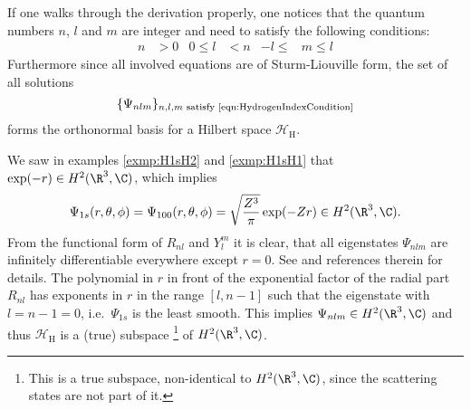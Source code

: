 If one walks through the derivation properly,
one notices that the quantum numbers $n$, $l$ and $m$ are integer and need to satisfy
the following conditions:
\begin{align}
	\label{eqn:HydrogenIndexCondition}
	n &> 0 & 0 \leq l &< n & -l \leq &m \leq l
\end{align}
Furthermore since all involved equations are of Sturm-Liouville form,
the set of all solutions
\[
	\{\Psi_{nlm} \}_{n,l,m \text{ satisfy \eqref{eqn:HydrogenIndexCondition}}}
\]
forms the orthonormal basis for a Hilbert space $\mathcal{H}_\text{H}$.

We saw in examples \vref{exmp:H1sH2} and \vref{exmp:H1sH1}
that $\exp(-r) \in H^2(\R^3, \C)$,
which implies
\[
	\Psi_{1s}(r, \theta, \phi) = \Psi_{100}(r, \theta, \phi)
	= \sqrt{\frac{Z^3}{\pi}} \exp(-Z r) \in H^2(\R^3, \C).
\]
From the functional form of $R_{nl}$ and $Y_l^m$ it is clear,
that all eigenstates $\Psi_{nlm}$ are infinitely differentiable everywhere
except $r = 0$.
See \cite{Kato1957} and references therein for details.
The polynomial in $r$ in front of the exponential factor of the radial part $R_{nl}$
has exponents in $r$ in the range $[l, n-1]$
such that the eigenstate with $l = n-1 = 0$, i.e.~$\Psi_{1s}$ is the least smooth.
This implies $\Psi_{nlm} \in H^2(\R^3, \C)$ and thus
$\mathcal{H}_\text{H}$ is a (true) subspace
\footnote{
	This is a true subspace, \ie non-identical to $H^2(\R^3, \C)$,
	since the scattering states are not part of it.
}
of $H^2(\R^3, \C)$.
